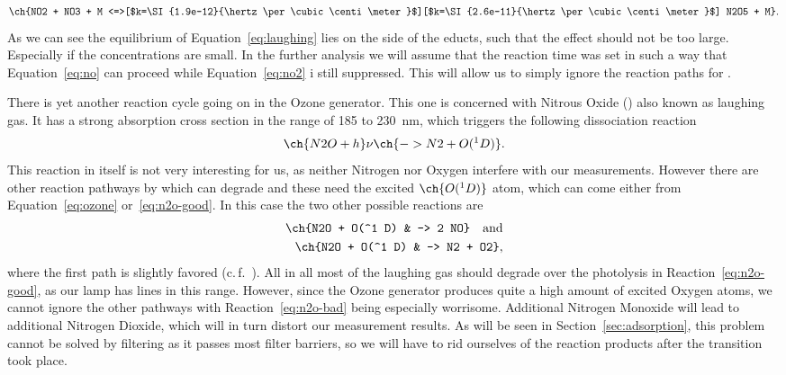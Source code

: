 \begin{align}
  \ch{NO2 + NO3 + M
  <=>[$k=\SI{1.9e-12}{\hertz\per\cubic\centi\meter}$][$k=\SI{2.6e-11}{\hertz\per\cubic\centi\meter}$]
  N2O5 + M}. \label{eq:laughing}
\end{align}
As we can see the equilibrium of Equation~\eqref{eq:laughing} lies on the
side of the educts, such that the effect should not be too large. Especially
if the  concentrations are small. In the further
analysis we will assume that the reaction time was set in such a way
that Equation~\eqref{eq:no} can proceed while Equation~\eqref{eq:no2}
i still suppressed. This will allow us to simply ignore the reaction
paths for . 

There is yet another reaction cycle going on in the Ozone
generator. This one is concerned with Nitrous Oxide () also
known as laughing gas. It has a strong absorption cross section in the
range of \num{185} to \SI{230}{\nano\meter}, which triggers the
following dissociation reaction
\begin{align}
  \ch{N2O + h}\nu \ch{-> N2 + O(^1 D)}.\label{eq:n2o-good}
\end{align}
This reaction in itself is not very interesting for us, as neither
Nitrogen nor Oxygen interfere with our measurements. However there are
other reaction pathways by which  can degrade and these need
the excited $\ch{O(^1D)}$ atom, which can come either from
Equation~\eqref{eq:ozone} or~\eqref{eq:n2o-good}. In this case the two
other possible reactions are
\begin{align}
  \ch{N2O + O(^1 D) & -> 2 NO} \quad \text{and}\label{eq:n2o-bad}\\
  \ch{N2O + O(^1 D) & -> N2 + O2}, \nonumber
\end{align}
where the first path is slightly favored (c.\,f.~\cite{n2o}). All in
all most of the laughing gas should degrade over the photolysis in
Reaction~\eqref{eq:n2o-good}, as our lamp has lines in this range.
However, since the Ozone generator produces quite a high amount of
excited Oxygen atoms, we cannot ignore the other pathways with
Reaction~\eqref{eq:n2o-bad} being especially worrisome. Additional
Nitrogen Monoxide will lead to additional Nitrogen Dioxide,
which will in turn distort our measurement results. As will be seen
in Section~\ref{sec:adsorption}, this problem cannot be solved by
filtering  as it passes most filter barriers, so we will have
to rid ourselves of the reaction products after the transition took
place.

